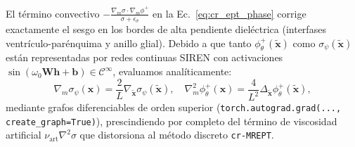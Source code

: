 \documentclass[10pt,journal,compsoc]{IEEEtran}
\begin{document}
El término convectivo $-\frac{\nabla_m\sigma \cdot \nabla_m\phi^+}{\sigma + \epsilon_\sigma}$ en la Ec.~\eqref{eq:cr_ept_phase} corrige exactamente el sesgo en los bordes de alta pendiente dieléctrica (interfases ventrículo-parénquima y anillo glial). Debido a que tanto $\phi^+_\theta(\tilde{\mathbf{x}})$ como $\sigma_\psi(\tilde{\mathbf{x}})$ están representadas por redes continuas SIREN con activaciones $\sin(\omega_0 \mathbf{W}\mathbf{h} + \mathbf{b}) \in \mathcal{C}^\infty$, evaluamos analíticamente:
\begin{equation}
\nabla_m \sigma_\psi(\mathbf{x}) = \frac{2}{L} \nabla_{\tilde{\mathbf{x}}} \sigma_\psi(\tilde{\mathbf{x}}), \quad \nabla_m^2 \phi^+_\theta(\mathbf{x}) = \frac{4}{L^2} \Delta_{\tilde{\mathbf{x}}} \phi^+_\theta(\tilde{\mathbf{x}}),
\end{equation}
mediante grafos diferenciables de orden superior (\texttt{torch.autograd.grad(..., create\_graph=True)}), prescindiendo por completo del término de viscosidad artificial $\nu_{\text{art}}\nabla^2\sigma$ que distorsiona al método discreto \texttt{cr-MREPT}.
\end{document}
